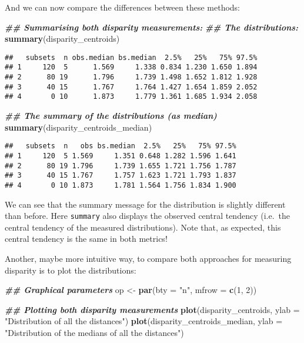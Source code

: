 \documentclass[
]{book}
\newenvironment{Shaded}{\begin{snugshade}}{\end{snugshade}}
\newcommand{\AttributeTok}[1]{\textcolor[rgb]{0.13,0.29,0.53}{#1}}
\newcommand{\DecValTok}[1]{\textcolor[rgb]{0.00,0.00,0.81}{#1}}
\newcommand{\DocumentationTok}[1]{\textcolor[rgb]{0.56,0.35,0.01}{\textbf{\textit{#1}}}}
\newcommand{\FunctionTok}[1]{\textcolor[rgb]{0.13,0.29,0.53}{\textbf{#1}}}
\newcommand{\NormalTok}[1]{#1}
\newcommand{\OtherTok}[1]{\textcolor[rgb]{0.56,0.35,0.01}{#1}}
\newcommand{\StringTok}[1]{\textcolor[rgb]{0.31,0.60,0.02}{#1}}
\begin{document}
And we can now compare the differences between these methods:

\begin{Shaded}
\begin{Highlighting}[]
\DocumentationTok{\#\# Summarising both disparity measurements:}
\DocumentationTok{\#\# The distributions:}
\FunctionTok{summary}\NormalTok{(disparity\_centroids)}
\end{Highlighting}
\end{Shaded}

\begin{verbatim}
##   subsets  n obs.median bs.median  2.5%   25%   75% 97.5%
## 1     120  5      1.569     1.338 0.834 1.230 1.650 1.894
## 2      80 19      1.796     1.739 1.498 1.652 1.812 1.928
## 3      40 15      1.767     1.764 1.427 1.654 1.859 2.052
## 4       0 10      1.873     1.779 1.361 1.685 1.934 2.058
\end{verbatim}

\begin{Shaded}
\begin{Highlighting}[]
\DocumentationTok{\#\# The summary of the distributions (as median)}
\FunctionTok{summary}\NormalTok{(disparity\_centroids\_median)}
\end{Highlighting}
\end{Shaded}

\begin{verbatim}
##   subsets  n   obs bs.median  2.5%   25%   75% 97.5%
## 1     120  5 1.569     1.351 0.648 1.282 1.596 1.641
## 2      80 19 1.796     1.739 1.655 1.721 1.756 1.787
## 3      40 15 1.767     1.757 1.623 1.721 1.793 1.837
## 4       0 10 1.873     1.781 1.564 1.756 1.834 1.900
\end{verbatim}

We can see that the summary message for the distribution is slightly different than before.
Here \texttt{summary} also displays the observed central tendency (i.e.~the central tendency of the measured distributions).
Note that, as expected, this central tendency is the same in both metrics!

Another, maybe more intuitive way, to compare both approaches for measuring disparity is to plot the distributions:

\begin{Shaded}
\begin{Highlighting}[]
\DocumentationTok{\#\# Graphical parameters}
\NormalTok{op }\OtherTok{\textless{}{-}} \FunctionTok{par}\NormalTok{(}\AttributeTok{bty =} \StringTok{"n"}\NormalTok{, }\AttributeTok{mfrow =} \FunctionTok{c}\NormalTok{(}\DecValTok{1}\NormalTok{, }\DecValTok{2}\NormalTok{))}

\DocumentationTok{\#\# Plotting both disparity measurements}
\FunctionTok{plot}\NormalTok{(disparity\_centroids,}
     \AttributeTok{ylab =} \StringTok{"Distribution of all the distances"}\NormalTok{)}
\FunctionTok{plot}\NormalTok{(disparity\_centroids\_median,}
     \AttributeTok{ylab =} \StringTok{"Distribution of the medians of all the distances"}\NormalTok{)}
\end{Highlighting}
\end{Shaded}
\end{document}
